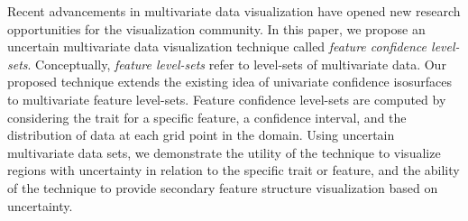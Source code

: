 %
Recent advancements in multivariate data visualization have opened new research opportunities for the visualization community.
%
In this paper, we propose 
an uncertain multivariate data visualization technique called \textit{feature confidence level-sets}.
%
%
Conceptually, \textit{feature level-sets} refer to level-sets of multivariate data. 
%
Our proposed technique extends the existing idea of univariate confidence isosurfaces to multivariate feature level-sets.
%
Feature confidence level-sets are computed by considering the trait for a specific feature, a confidence interval, and the distribution of data at each grid point in the domain.
%
%
Using uncertain multivariate data sets, we demonstrate the utility of the technique to visualize regions with uncertainty in relation to the specific trait or feature, and the ability of the technique to provide secondary feature structure visualization based on uncertainty.
%
%

